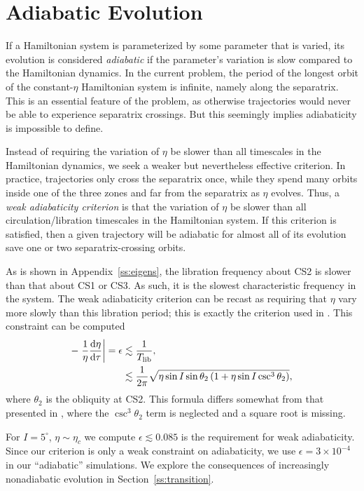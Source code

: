 \documentclass[
        fleqn,
        usenatbib,
        referee,
    ]{mnras}
\newcommand*{\rd}[2]{\frac{\mathrm{d}#1}{\mathrm{d}#2}}
\newcommand*{\at}[1]{\left.#1\right|}
\newcommand*{\p}[1]{\left(#1\right)}
\begin{document}
\section{Adiabatic Evolution}\label{s:ad}

If a Hamiltonian system is parameterized by some parameter that is varied, its
evolution is considered \emph{adiabatic} if the parameter's variation is slow
compared to the Hamiltonian dynamics. In the current problem, the period of the
longest orbit of the constant-$\eta$ Hamiltonian system is infinite, namely
along the separatrix. This is an essential feature of the problem, as otherwise
trajectories would never be able to experience separatrix crossings. But this
seemingly implies adiabaticity is impossible to define.

Instead of requiring the variation of $\eta$ be slower than all timescales in
the Hamiltonian dynamics, we seek a weaker but nevertheless effective criterion.
In practice, trajectories only cross the separatrix once, while they spend many
orbits inside one of the three zones and far from the separatrix as $\eta$
evolves. Thus, a \emph{weak adiabaticity criterion} is that the variation of
$\eta$ be slower than all circulation/libration timescales in the Hamiltonian
system. If this criterion is satisfied, then a given trajectory will be
adiabatic for almost all of its evolution save one or two separatrix-crossing
orbits.

As is shown in Appendix~\ref{ss:eigens}, the libration frequency about CS2 is slower
than that about CS1 or CS3. As such, it is the slowest characteristic frequency
in the system. The weak adiabaticity criterion can be recast as requiring that
$\eta$ vary more slowly than this libration period; this is exactly the
criterion used in \citep{ward2004II,millholland_disk}. This constraint can be
computed
\begin{align}
    -\at{\frac{1}{\eta}\rd{\eta}{\tau}} = \epsilon &\lesssim
            \frac{1}{T_{\rm lib}},\\
        &\lesssim \frac{1}{2\pi}\sqrt{\eta\sin I \sin \theta_2
            \p{1 + \eta \sin I \csc^3 \theta_2}},
            \label{eq:ad_constr}
\end{align}
where $\theta_2$ is the obliquity at CS2. This formula differs somewhat from
that presented in \citet{millholland_disk}, where the $\csc^3\theta_2$ term is
neglected and a square root is missing.

For $I = 5^\circ$, $\eta \sim \eta_c$ we compute $\epsilon \lesssim 0.085$ is
the requirement for weak adiabaticity. Since our criterion is only a weak
constraint on adiabaticity, we use $\epsilon = 3 \times 10^{-4}$ in our
``adiabatic'' simulations. We explore the consequences of increasingly
nonadiabatic evolution in Section~\ref{ss:transition}.
\end{document}
